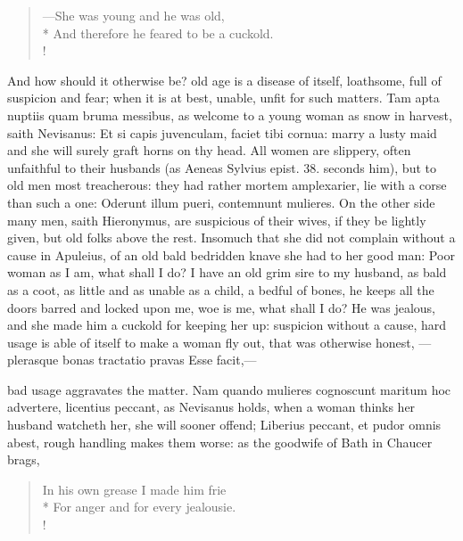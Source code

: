 {{
\verselinenumbersleft
{}
{\gothfont
\begin{verse}
---She was young and he was old,\\*
And therefore he feared to be a cuckold.\\!
\end{verse}
}
\verselinenumbersright
}

And how should it otherwise be? old age is a disease of itself,
loathsome, full of suspicion and fear; when it is at best, unable,
unfit for such matters. Tam apta nuptiis quam bruma messibus, as
welcome to a young woman as snow in harvest, saith Nevisanus: Et si
capis juvenculam, faciet tibi cornua: marry a lusty maid and she will
surely graft horns on thy head. All women are slippery, often
unfaithful to their husbands (as Aeneas Sylvius epist. 38. seconds
him), but to old men most treacherous: they had rather mortem
amplexarier, lie with a corse than such a one: Oderunt illum
pueri, contemnunt mulieres. On the other side many men, saith
Hieronymus, are suspicious of their wives, if they be lightly
given, but old folks above the rest. Insomuch that she did not complain
without a cause in Apuleius, of an old bald bedridden knave she
had to her good man: Poor woman as I am, what shall I do? I have an old
grim sire to my husband, as bald as a coot, as little and as unable as
a child, a bedful of bones, he keeps all the doors barred and locked
upon me, woe is me, what shall I do? He was jealous, and she made him a
cuckold for keeping her up: suspicion without a cause, hard usage is
able of itself to make a woman fly out, that was otherwise honest,
---plerasque bonas tractatio pravas
Esse facit,---

bad usage aggravates the matter. Nam quando mulieres cognoscunt maritum
hoc advertere, licentius peccant, as Nevisanus holds, when a
woman thinks her husband watcheth her, she will sooner offend;
Liberius peccant, et pudor omnis abest, rough handling makes them
worse: as the goodwife of Bath in Chaucer brags,

{
\verselinenumbersleft
{}
{\gothfont
\begin{verse}
In his own grease I made him frie\\*
For anger and for every jealousie.\\!
\end{verse}
}
\verselinenumbersright
}

}
